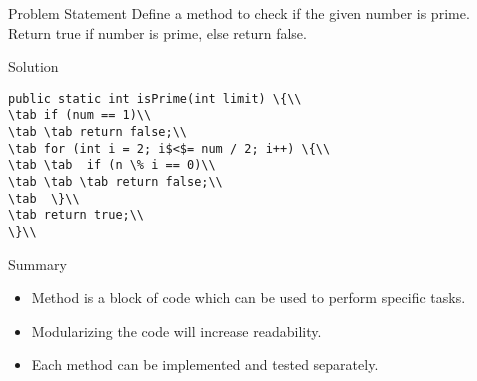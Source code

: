 \documentclass[aspectratio=169,14pt,usenames,dvipsnames]{beamer}
\newcommand\tab[1][1cm]{\hspace*{#1}}
\begin{document}
\begin{frame}{Problem Statement}
Define a method to check if the given number is
prime. Return true if number is prime, else
return false.
\end{frame}


\begin{frame}{Solution}
\begin{lstlisting}
public static int isPrime(int limit) \{\\
\tab if (num == 1)\\
\tab \tab return false;\\
\tab for (int i = 2; i$<$= num / 2; i++) \{\\
\tab \tab  if (n \% i == 0)\\
\tab \tab \tab return false;\\
\tab  \}\\
\tab return true;\\
\}\\
\end{lstlisting}
\end{frame}



\begin{frame}{Summary}
\begin{itemize}
    \item Method is a block of code which can be
used to perform specific tasks.
\item Modularizing the code will increase
readability.
\item Each method can be implemented and
tested separately.
\end{itemize}
\end{frame}
\end{document}

